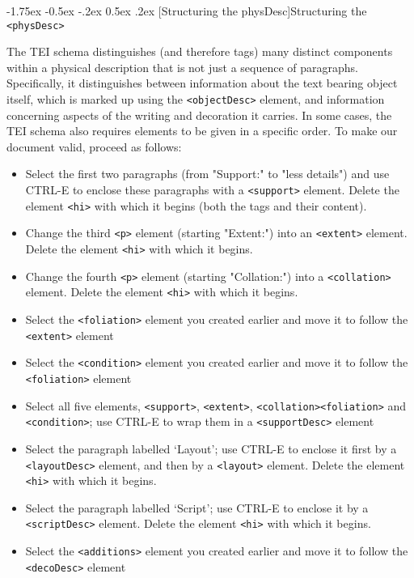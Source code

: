 \documentclass[11pt,twoside]{article}\makeatletter
\makeatletter
\renewcommand\section{\@startsection {section}{1}{\z@}%
     {-1.75ex \@plus -0.5ex \@minus -.2ex}%
     {0.5ex \@plus .2ex}%
     {\reset@font\Large\bfseries\sffamily}}
\makeatother
\begin{document}
\section[{Structuring the physDesc}]{Structuring the \texttt{<physDesc>}}\par
The TEI schema distinguishes (and therefore tags) many distinct components within a physical description that is not just a sequence of paragraphs. Specifically, it distinguishes between information about the text bearing object itself, which is marked up using the \texttt{<objectDesc>} element, and information concerning aspects of the writing and decoration it carries. In some cases, the TEI schema also requires elements to be given in a specific order. To make our document valid, proceed as follows: \begin{itemize}
\item Select the first two paragraphs (from "Support:" to "less details") and use CTRL-E to enclose these paragraphs with a \texttt{<support>} element. Delete the element \texttt{<hi>} with which it begins (both the tags and their content).
\item Change the third \texttt{<p>} element (starting "Extent:") into an \texttt{<extent>} element. Delete the element \texttt{<hi>} with which it begins.
\item Change the fourth \texttt{<p>} element (starting "Collation:") into a \texttt{<collation>} element. Delete the element \texttt{<hi>} with which it begins.
\item Select the \texttt{<foliation>} element you created earlier and move it to follow the \texttt{<extent>} element
\item Select the \texttt{<condition>} element you created earlier and move it to follow the \texttt{<foliation>} element
\item Select all five elements, \texttt{<support>}, \texttt{<extent>}, \texttt{<collation>}\texttt{<foliation>} and \texttt{<condition>}; use CTRL-E to wrap them in a \texttt{<supportDesc>} element
\item Select the paragraph labelled ‘Layout’; use CTRL-E to enclose it first by a \texttt{<layoutDesc>} element, and then by a \texttt{<layout>} element. Delete the element \texttt{<hi>} with which it begins.
\item Select the paragraph labelled ‘Script’; use CTRL-E to enclose it by a \texttt{<scriptDesc>} element. Delete the element \texttt{<hi>} with which it begins.
\item Select the \texttt{<additions>} element you created earlier and move it to follow the \texttt{<decoDesc>} element
\end{itemize} \par
\end{document}
